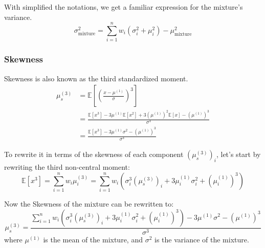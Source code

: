 With simplified the notations, we get a familiar expression for the mixture's variance.
\[
    \sigma^2_\text{mixture} = \sum^n_{i=1} w_i (\sigma^2_i+\mu^2_i) - \mu^2_\text{mixture}
\]



\subsubsection*{Skewness}
Skewness is also known as the third standardized moment. 
\begin{align}
    \mu^{(3)}_s &= \mathbb{E}[ \left( \frac{x-\mu^{(1)}}{\sigma} \right) ^3] \\
                &= \frac{\mathbb{E}[x^3] - 3 \mu^{(1)} \mathbb{E}[x^2] + 3 (\mu^{(1)})^2 \mathbb{E}[x] - (\mu^{(1)})^3}{\sigma^3} \\
                &= \frac{\mathbb{E}[x^3] - 3 \mu^{(1)} \sigma^2 - (\mu^{(1)})^3}{\sigma^3} 
\end{align}

To rewrite it in terms of the skewness of each component $(\mu^{(3)}_s)_i$, let's start by rewriting the third non-central moment:
\[
    \mathbb{E}[x^3] = \sum^n_{i=1} w_i \mu^{(3)}_i = \sum^n_{i=1} w_i \left( \sigma^3_i (\mu^{(3)}_s)_i + 3 \mu^{(1)}_i \sigma^2_i + (\mu^{(1)}_i)^3 \right)
\]

Now the Skewness of the mixture can be rewritten to:
\[
    \mu^{(3)}_s = \frac{ \sum^n_{i=1} w_i \left( \sigma^3_i (\mu^{(3)}_s)_i + 3 \mu^{(1)}_i \sigma^2_i + (\mu^{(1)}_i)^3 \right)  - 3 \mu^{(1)} \sigma^2 - (\mu^{(1)})^3 }{\sigma^3}
\]
where $\mu^{(1)}$ is the mean of the mixture, and $\sigma^2$ is the variance of the mixture.